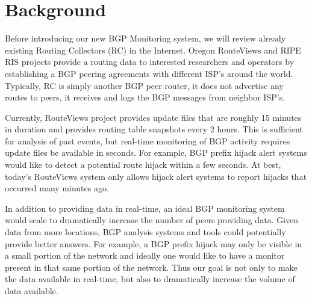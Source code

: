 \section{Background}
\label{sec:background}



Before introducing our new BGP Monitoring system, we will review already existing Routing Collectors (RC) in the Internet. Oregon RouteViews \cite{routeviews} and RIPE RIS\cite{riperis} projects provide a routing data to interested researchers and operators by establishing a BGP peering agreements with different ISP's around the world. Typically, RC is simply another BGP peer router, it does not advertise any routes to peers, it receives and logs the BGP messages from neighbor ISP's.

Currently, RouteViews project provides update files that are roughly 15 minutes in duration and provides routing table snapshots every 2 hours. This is sufficient for analysis of past events, but real-time monitoring of BGP activity requires update files be available in seconds. For example, BGP prefix hijack alert systems would like to detect a potential route hijack within a few seconds. At best, today's RouteViews system only allows hijack alert systems to report hijacks that occurred many minutes ago.

In addition to providing data in real-time, an ideal BGP monitoring system would scale to dramatically increase the number of peers providing data.   Given data from more locations,  BGP analysis systems and tools could potentially provide better answers. For example, a BGP prefix hijack may only be visible in a small portion of the network and ideally one would like to have a monitor present in that same portion of the network. Thus our goal is not only to make the data available in real-time, but also to dramatically increase the volume of data available.

